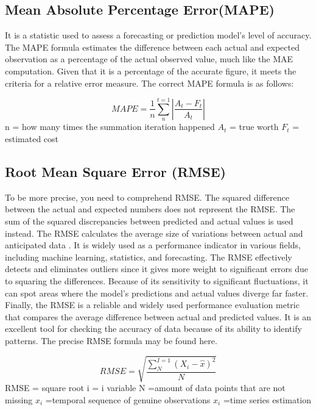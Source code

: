 \documentclass[a4paper,fleqn]{cas-sc}
\begin{document}
\subsection{Mean Absolute Percentage Error(MAPE)}
It is a statistic used to assess a forecasting or prediction model's level of accuracy. The MAPE formula estimates the difference between each actual and expected observation as a percentage of the actual observed value, much like the MAE computation. Given that it is a percentage of the accurate figure, it meets the criteria for a relative error measure\cite{dhingra2023pseudo}. The correct MAPE formula is as follows:

\begin{equation}
MAPE = \frac{1}{n}\sum_{n}^{t=1}|\frac{A_t-F_t}{A_t}|
\end{equation}
n = how many times the summation iteration happened
${A_t}$ = true worth
${F_t }$ = estimated cost



\subsection{Root Mean Square Error (RMSE)}
To be more precise, you need to comprehend RMSE. The squared difference between the actual and expected numbers does not represent the RMSE. The sum of the squared discrepancies between predicted and actual values is used instead. The RMSE calculates the average size of variations between actual and anticipated data \cite{mellit201024}. It is widely used as a performance indicator in various fields, including machine learning, statistics, and forecasting. The RMSE effectively detects and eliminates outliers since it gives more weight to significant errors due to squaring the differences. Because of its sensitivity to significant fluctuations, it can spot areas where the model's predictions and actual values diverge far faster. Finally, the RMSE is a reliable and widely used performance evaluation metric that compares the average difference between actual and predicted values. It is an excellent tool for checking the accuracy of data because of its ability to identify patterns. The precise RMSE formula may be found here\cite{abuella2015solar}.

\begin{equation}
RMSE = \sqrt{\frac{\sum_{N}^{I=1}(X_i-\hat{x})^{2}}{N}}
\end{equation}
RMSE = square root
i = i variable
N =amount of data points that are not missing
${x_i}$ =temporal sequence of genuine observations
${x_i}$ =time series estimation
\end{document}
